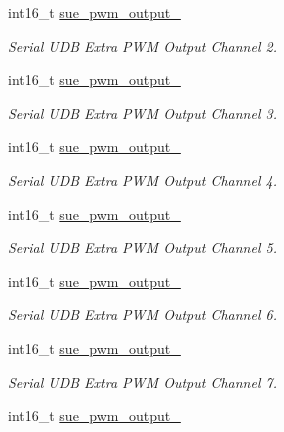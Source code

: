 \begin{DoxyCompactItemize}
int16\+\_\+t \hyperlink{struct____mavlink__serial__udb__extra__f2__b__t_a527f8cac8b88462477b89f16758723f1}{sue\+\_\+pwm\+\_\+output\+\_}
\begin{DoxyCompactList}\small\item\em Serial U\+D\+B Extra P\+W\+M Output Channel 2. \end{DoxyCompactList}\item 
int16\+\_\+t \hyperlink{struct____mavlink__serial__udb__extra__f2__b__t_aa2605ce27e0143bd30932e93f4c78c06}{sue\+\_\+pwm\+\_\+output\+\_}
\begin{DoxyCompactList}\small\item\em Serial U\+D\+B Extra P\+W\+M Output Channel 3. \end{DoxyCompactList}\item 
int16\+\_\+t \hyperlink{struct____mavlink__serial__udb__extra__f2__b__t_a7cc4c9bebc7e160aa6f765669eca874d}{sue\+\_\+pwm\+\_\+output\+\_}
\begin{DoxyCompactList}\small\item\em Serial U\+D\+B Extra P\+W\+M Output Channel 4. \end{DoxyCompactList}\item 
int16\+\_\+t \hyperlink{struct____mavlink__serial__udb__extra__f2__b__t_a2db3d8325d8e64d1ba6b6994fcdb6367}{sue\+\_\+pwm\+\_\+output\+\_}
\begin{DoxyCompactList}\small\item\em Serial U\+D\+B Extra P\+W\+M Output Channel 5. \end{DoxyCompactList}\item 
int16\+\_\+t \hyperlink{struct____mavlink__serial__udb__extra__f2__b__t_a23afa3f2a5a3d0b29e792dcf1666f855}{sue\+\_\+pwm\+\_\+output\+\_}
\begin{DoxyCompactList}\small\item\em Serial U\+D\+B Extra P\+W\+M Output Channel 6. \end{DoxyCompactList}\item 
int16\+\_\+t \hyperlink{struct____mavlink__serial__udb__extra__f2__b__t_a8c1190f68e69d78d33db18eeae64d549}{sue\+\_\+pwm\+\_\+output\+\_}
\begin{DoxyCompactList}\small\item\em Serial U\+D\+B Extra P\+W\+M Output Channel 7. \end{DoxyCompactList}\item 
int16\+\_\+t \hyperlink{struct____mavlink__serial__udb__extra__f2__b__t_a98cf30e1f369c5fc595082d468d19fb6}{sue\+\_\+pwm\+\_\+output\+\_}

\end{DoxyCompactItemize}
